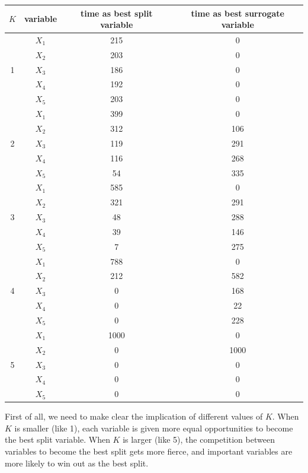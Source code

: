 \documentclass[paper=letter, fontsize=12pt]{article}
\begin{document}
\begin{enumerate}[label=(\alph*)]
\begin{enumerate}[label=(\roman*)]
		\begin{center}
			\begin{longtable}{|c|c|c|c|}
				\hline
				$K$ & variable & time as best split variable  & time as best surrogate variable \\ \hline
				\multirow{5}{1em}{1} & $X_1$ & 215 & 0 \\ 
				& $X_2$ & 203 & 0\\
				& $X_3$ & 186 & 0\\
				& $X_4$ & 192 & 0\\
				& $X_5$ & 203 & 0\\
				\hline
				\multirow{5}{1em}{2} & $X_1$ & 399 & 0\\ 
				& $X_2$ & 312 & 106\\
				& $X_3$ & 119 & 291\\
				& $X_4$ & 116 & 268\\
				& $X_5$ & 54 & 335\\
				\hline
				\multirow{5}{1em}{3} & $X_1$ & 585 & 0 \\ 
				& $X_2$ & 321 & 291\\
				& $X_3$ & 48 & 288\\
				& $X_4$ & 39 & 146\\
				& $X_5$ & 7 & 275\\
				\hline
				\multirow{5}{1em}{4} & $X_1$ & 788 & 0\\ 
				& $X_2$ & 212 & 582\\
				& $X_3$ & 0 & 168\\
				& $X_4$ & 0 & 22\\
				& $X_5$ & 0 & 228\\
				\hline
				\multirow{5}{1em}{5} & $X_1$ & 1000 & 0\\ 
				& $X_2$ & 0 & 1000\\
				& $X_3$ & 0 & 0\\
				& $X_4$ & 0 & 0\\
				& $X_5$ & 0 & 0\\
				\hline
			\end{longtable}
		\end{center}	
	
		First of all, we need to make clear the implication of different values of $K$. When $K$ is smaller (like 1), each variable is given more equal opportunities to become the best split variable. When $K$ is larger (like 5), the competition between variables to become the best split gets more fierce, and important variables are more likely to win out as the best split.
	

\end{enumerate}
\end{enumerate}
\end{document}
